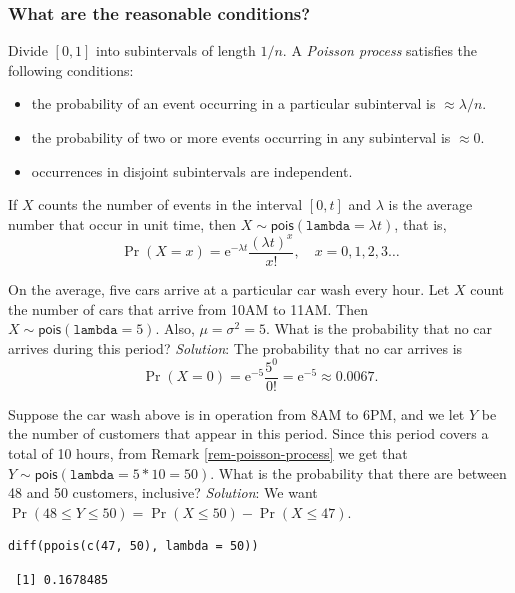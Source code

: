 \documentclass[captions=tableheading]{scrbook}
\begin{document}
\subsubsection{What are the reasonable conditions?}
\label{sec-5-6-3-2}


Divide \([0,1]\) into subintervals of length \(1/n\). A \emph{Poisson process} satisfies the following conditions:
\begin{itemize}
\item the probability of an event occurring in a particular subinterval is \(\approx\lambda/n\).
\item the probability of two or more events occurring in any subinterval is \(\approx 0\).
\item occurrences in disjoint subintervals are independent.
\end{itemize}

\begin{rem}

If \(X\) counts the number of events in the interval \([0,t]\) and \(\lambda\) is the average number that occur in unit time, then \(X\sim\mathsf{pois}(\mathtt{lambda}=\lambda t)\), that is,
\begin{equation}
\Pr(X=x)=\mathrm{e}^{-\lambda t}\frac{(\lambda t)^{x}}{x!},\quad x=0,1,2,3\ldots
\end{equation}
\end{rem}

\begin{example}
On the average, five cars arrive at a particular car wash every hour. Let \(X\) count the number of cars that arrive from 10AM to 11AM. Then \(X\sim\mathsf{pois}(\mathtt{lambda}=5)\). Also, \(\mu=\sigma^{2}=5\). What is the probability that no car arrives during this period? 
\emph{Solution}: The probability that no car arrives is
\[
\Pr(X=0)=\mathrm{e}^{-5}\frac{5^{0}}{0!}=\mathrm{e}^{-5}\approx0.0067.
\]
\end{example}

\begin{example}
Suppose the car wash above is in operation from 8AM to 6PM, and we let \(Y\) be the number of customers that appear in this period. Since this period covers a total of 10 hours, from Remark \ref{rem-poisson-process} we get that \(Y\sim\mathsf{pois}(\mathtt{lambda}=5\ast10=50)\). What is the probability that there are between 48 and 50 customers, inclusive? 
\emph{Solution}: We want \(\Pr(48\leq Y\leq50)=\Pr(X\leq50)-\Pr(X\leq47)\). 


\begin{verbatim}
diff(ppois(c(47, 50), lambda = 50))
\end{verbatim}

\begin{verbatim}
 [1] 0.1678485
\end{verbatim}

\end{example}
\end{document}
